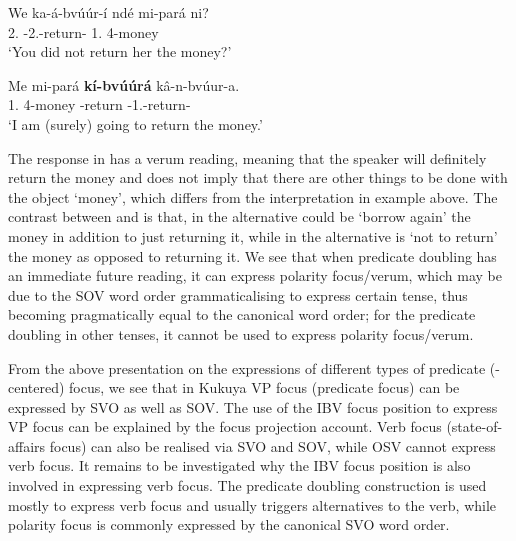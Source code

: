 \documentclass[output=paper,colorlinks,citecolor=brown,
]{langscibook}
\begin{document}
\begin{exe}
     \ex \label{65}
    \begin{xlist}
\ex
\label{65a}
\gll
We ka-á-bvúúr-í ndé mi-pará ni?\\
2\Sg{}.\Pro{} \Neg{}-2\Sg{}.\Pst{}-return-\Pst{} 1.\Pro{} 4-money \Neg{}\\
\trans ‘You did not return her the money?’

\ex
\label{65b}
\gll
Me mi-pará \textbf{kí-bvúúrá} kâ-n-bvúur-a.\\
1\Sg{}.\Pro{} 4-money \Inf{}-return \Prs{}-1\Sg{}.\Sm{}-return-\Fv{}\\
\trans ‘I am (surely) going to return the money.’

    \end{xlist}
\end{exe}
The response in  has a verum reading, meaning that the speaker will definitely return the money and does not imply that there are other things to be done with the object `money', which differs from the interpretation in example  above. The contrast between  and  is that, in  the alternative could be `borrow again' the money in addition to just returning it, while in  the alternative is `not to return' the money as opposed to returning it. We see that when predicate doubling has an immediate future reading, it can express polarity focus/verum, which may be due to the SOV word order grammaticalising to express certain tense, thus becoming pragmatically equal to the canonical word order; for the predicate doubling in other tenses, it cannot be used to express polarity focus/verum.

From the above presentation on the expressions of different types of predicate \mbox{(-centered)} focus, we see that in Kukuya VP focus (predicate focus) can be expressed by SVO as well as SOV. The use of the IBV focus position to express VP focus can be explained by the focus projection account. Verb focus (state-of-affairs focus) can also be realised via SVO and SOV, while OSV cannot express verb focus. It remains to be investigated why the IBV focus position is also involved in expressing verb focus. The predicate doubling construction is used mostly to express verb focus and usually triggers alternatives to the verb, while polarity focus is commonly expressed by the canonical SVO word order.
\end{document}
